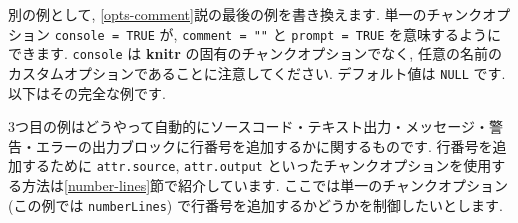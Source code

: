 \documentclass[
  11pt,
]{bxjsreport}
\newenvironment{Shaded}{\begin{snugshade}}{\end{snugshade}}
\newcommand{\InformationTok}[1]{\textcolor[rgb]{0.56,0.35,0.01}{\textbf{\textit{#1}}}}
\newcommand{\NormalTok}[1]{#1}
\begin{document}
別の例として, \ref{opts-comment}説の最後の例を書き換えます. 単一のチャンクオプション \texttt{console = TRUE} が, \texttt{comment = ""} と \texttt{prompt = TRUE} を意味するようにできます. \texttt{console} は \textbf{knitr} の固有のチャンクオプションでなく, 任意の名前のカスタムオプションであることに注意してください. デフォルト値は \texttt{NULL} です. 以下はその完全な例です.

\begin{Shaded}
\end{Shaded}

3つ目の例はどうやって自動的にソースコード・テキスト出力・メッセージ・警告・エラーの出力ブロックに行番号を追加するかに関するものです. 行番号を追加するために \texttt{attr.source}, \texttt{attr.output} といったチャンクオプションを使用する方法は\ref{number-lines}節で紹介しています. ここでは単一のチャンクオプション (この例では \texttt{numberLines}) で行番号を追加するかどうかを制御したいとします.
\end{document}
